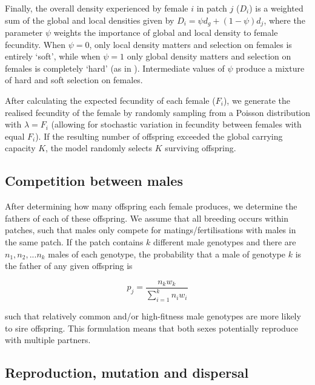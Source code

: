\documentclass[]{rsos}%
\begin{document}
Finally, the overall density experienced by female \(i\) in patch \(j\)
(\(D_i\)) is a weighted sum of the global and local densities given by
\(D_i = \psi d_g + (1 - \psi)d_j\), where the parameter \(\psi\) weights
the importance of global and local density to female fecundity. When
\(\psi = 0\), only local density matters and selection on females is
entirely `soft', while when \(\psi = 1\) only global density matters and
selection on females is completely `hard' (as in \citep{li2018ev}).
Intermediate values of \(\psi\) produce a mixture of hard and soft
selection on females.

After calculating the expected fecundity of each female (\(F_i\)), we
generate the realised fecundity of the female by randomly sampling from
a Poisson distribution with \(\lambda = F_i\) (allowing for stochastic
variation in fecundity between females with equal \(F_i\)). If the
resulting number of offspring exceeded the global carrying capacity
\(K\), the model randomly selects \(K\) surviving offspring.

\hypertarget{competition-between-males}{%
\subsection{Competition between males}\label{competition-between-males}}

After determining how many offspring each female produces, we determine
the fathers of each of these offspring. We assume that all breeding
occurs within patches, such that males only compete for
matings/fertilisations with males in the same patch. If the patch
contains \(k\) different male genotypes and there are
\(n_1, n_2, ... n_k\) males of each genotype, the probability that a
male of genotype \(k\) is the father of any given offspring is

\begin{equation}
\tag{4}
p_j = \frac{n_{k}w_k}{\sum_{i=1}^{k}n_{i}w_i}
\end{equation}

such that relatively common and/or high-fitness male genotypes are more
likely to sire offspring. This formulation means that both sexes
potentially reproduce with multiple partners.

\hypertarget{reproduction-mutation-and-dispersal}{%
\subsection{Reproduction, mutation and
dispersal}\label{reproduction-mutation-and-dispersal}}
\end{document}
